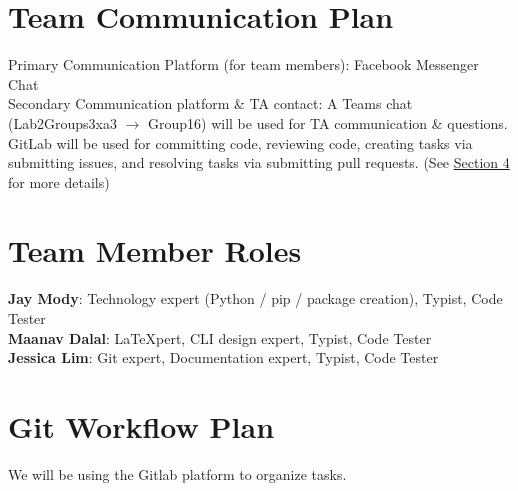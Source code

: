 \documentclass{article}
\begin{document}
\section{Team Communication Plan}
\noindent Primary Communication Platform (for team members): Facebook Messenger Chat \\

\noindent Secondary Communication platform \& TA contact: A Teams chat (Lab2Groups3xa3 $\rightarrow$ Group16) will be used for TA communication \& questions. \\

\noindent GitLab will be used for committing code, reviewing code, creating tasks via submitting issues, and resolving tasks via submitting pull requests. (See \hyperref[sec:git]{Section 4} for more details)

\section{Team Member Roles}

\noindent \textbf{Jay Mody}: Technology expert (Python / pip / package creation), Typist, Code Tester \\
\textbf{Maanav Dalal}: LaTeXpert, CLI design expert, Typist, Code Tester \\
\textbf{Jessica Lim}: Git expert, Documentation expert, Typist, Code Tester

\section{Git Workflow Plan}
\label{sec:git}
We will be using the Gitlab platform to organize tasks.
\end{document}
